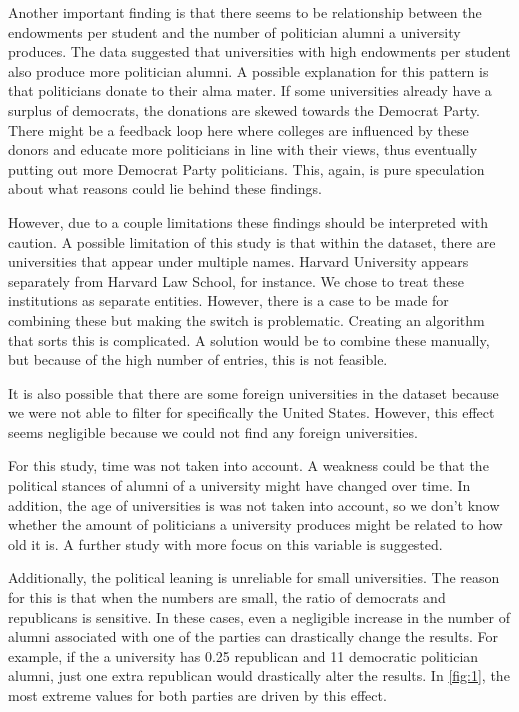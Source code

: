\documentclass{article}
\begin{document}
Another important finding is that there seems to be relationship between the endowments per student and the number of politician alumni a university produces. The data suggested that universities with high endowments per student also produce more politician alumni. A possible explanation for this pattern is that politicians donate to their alma mater. If some universities already have a surplus of democrats, the donations are skewed towards the Democrat Party. There might be a feedback loop here where colleges are influenced by these donors and educate more politicians in line with their views, thus eventually putting out more Democrat Party politicians. This, again, is pure speculation about what reasons could lie behind these findings.

However, due to a couple limitations these findings should be interpreted with caution. A possible limitation of this study is that within the dataset, there are universities that appear under multiple names. Harvard University appears separately from Harvard Law School, for instance. We chose to treat these institutions as separate entities. However, there is a case to be made for combining these but making the switch is problematic. Creating an algorithm that sorts this is complicated. A solution would be to combine these manually, but because of the high number of entries, this is not feasible.

It is also possible that there are some foreign universities in the dataset because we were not able to filter for specifically the United States. However, this effect seems negligible because we could not find any foreign universities.

For this study, time was not taken into account. A weakness could be that the political stances of alumni of a university might have changed over time. In addition, the age of universities is was not taken into account, so we don't know whether the amount of politicians a university produces might be related to how old it is. A further study with more focus on this variable is suggested.

Additionally, the political leaning is unreliable for small universities. The reason for this is that when the numbers are small, the ratio of democrats and republicans is sensitive. In these cases, even a negligible increase in the number of  alumni associated with one of the parties can drastically change the results. For example, if the a university has 0.25 republican and 11 democratic politician alumni, just one extra republican would drastically alter the results. In \autoref{fig:1}, the most extreme values for both parties are driven by this effect. 
\end{document}
